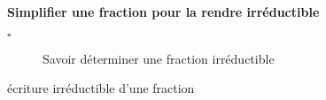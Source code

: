 \begin{titre}[Arithmétique]

\end{titre}
 

\begin{CpsCol}
\textbf{Simplifier une fraction pour la rendre irréductible}
\begin{description}
\item[$\square$] Savoir déterminer une fraction irréductible

\end{description}
\end{CpsCol}



\begin{DefT}{écriture irréductible d'une fraction}

\end{DefT}

\begin{Ex}

\end{Ex}











